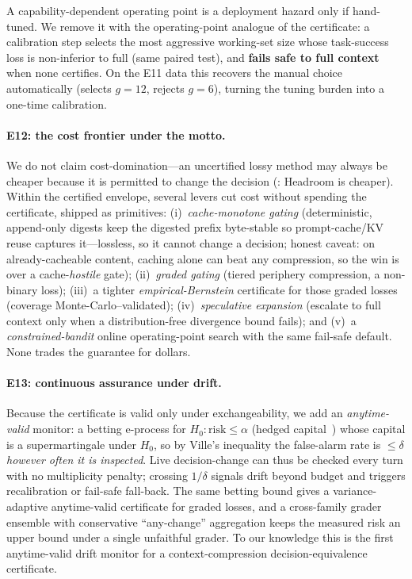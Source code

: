 \documentclass{article}
\begin{document}
A capability-dependent operating point is a deployment hazard only if hand-tuned. We remove it
with the operating-point analogue of the certificate: a calibration step selects the most
aggressive working-set size whose task-success loss is non-inferior to full (same paired test),
and \textbf{fails safe to full context} when none certifies. On the E11 data this recovers the
manual choice automatically (selects $g{=}12$, rejects $g{=}6$), turning the tuning burden into
a one-time calibration.

\paragraph{E12: the cost frontier under the motto.}
We do not claim cost-domination---an uncertified lossy method may always be cheaper because it
is permitted to change the decision (: Headroom is cheaper). Within the certified
envelope, several levers cut cost without spending the certificate, shipped as primitives:
(i)~\emph{cache-monotone gating} (deterministic, append-only digests keep the digested prefix
byte-stable so prompt-cache/KV reuse captures it---lossless, so it cannot change a decision;
honest caveat: on already-cacheable content, caching alone can beat any compression, so the win
is over a cache-\emph{hostile} gate); (ii)~\emph{graded gating} (tiered periphery compression,
a non-binary loss); (iii)~a tighter \emph{empirical-Bernstein} certificate for those graded
losses (coverage Monte-Carlo--validated); (iv)~\emph{speculative expansion} (escalate to full
context only when a distribution-free divergence bound fails); and (v)~a \emph{constrained-bandit}
online operating-point search with the same fail-safe default. None trades the guarantee for
dollars.

\paragraph{E13: continuous assurance under drift.}
Because the certificate is valid only under exchangeability, we add an \emph{anytime-valid}
monitor: a betting e-process for $H_0\!:\text{risk}\le\alpha$ (hedged capital~\cite{wsr})
whose capital is a supermartingale under $H_0$, so by Ville's inequality the
false-alarm rate is $\le\delta$ \emph{however often it is inspected}. Live decision-change can
thus be checked every turn with no multiplicity penalty; crossing $1/\delta$ signals drift
beyond budget and triggers recalibration or fail-safe fall-back. The same betting bound gives a
variance-adaptive anytime-valid certificate for graded losses, and a cross-family grader
ensemble with conservative ``any-change'' aggregation keeps the measured risk an upper bound
under a single unfaithful grader. To our knowledge this is the first anytime-valid drift monitor
for a context-compression decision-equivalence certificate.
\end{document}
